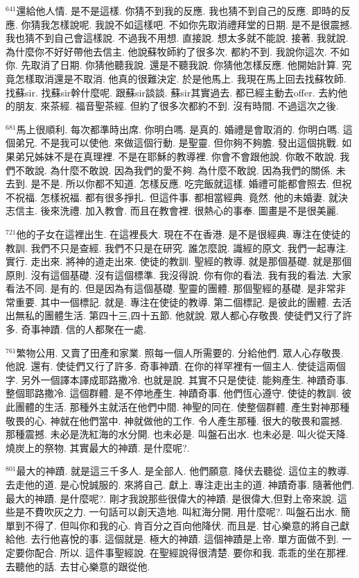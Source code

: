 \documentclass{book}
\begin{document}
$^{641}$還給他人情.
是不是這樣.
你猜不到我的反應.
我也猜不到自己的反應.
即時的反應.
你猜我怎樣說呢.
我說不如這樣吧.
不如你先取消禮拜堂的日期.
是不是很震撼.
我也猜不到自己會這樣說.
不過我不用想.
直接說.
想太多就不能說.
接著.
我就說.
為什麼你不好好帶他去信主.
他說蘇牧師約了很多次.
都約不到.
我說你這次.
不如你.
先取消了日期.
你猜他聽我說.
還是不聽我說.
你猜他怎樣反應.
他開始計算.
究竟怎樣取消還是不取消.
他真的很難決定.
於是他馬上.
我現在馬上回去找蘇牧師.
找蘇sir.
找蘇sir幹什麼呢.
跟蘇sir談談.
蘇sir其實過去.
都已經主動去offer.
去約他的朋友.
來茶經.
福音聖茶經.
但約了很多次都約不到.
沒有時間.
不過這次之後.

$^{681}$馬上很順利.
每次都準時出席.
你明白嗎.
是真的.
婚禮是會取消的.
你明白嗎.
這個弟兄.
不是我可以使他.
來做這個行動.
是聖靈.
但你夠不夠膽.
發出這個挑戰.
如果弟兄姊妹不是在真理裡.
不是在耶穌的教導裡.
你會不會跟他說.
你敢不敢說.
我們不敢說.
為什麼不敢說.
因為我們的愛不夠.
為什麼不敢說.
因為我們的關係.
未去到.
是不是.
所以你都不知道.
怎樣反應.
吃完飯就這樣.
婚禮可能都會照去.
但祝不祝福.
怎樣祝福.
都有很多掙扎.
但這件事.
都相當經典.
竟然.
他的未婚妻.
就決志信主.
後來洗禮.
加入教會.
而且在教會裡.
很熱心的事奉.
圖畫是不是很美麗.

$^{721}$他的子女在這裡出生.
在這裡長大.
現在不在香港.
是不是很經典.
專注在使徒的教訓.
我們不只是查經.
我們不只是在研究.
誰怎麼說.
識經的原文.
我們一起專注.
實行.
走出來.
將神的道走出來.
使徒的教訓.
聖經的教導.
就是那個基礎.
就是那個原則.
沒有這個基礎.
沒有這個標準.
我沒得說.
你有你的看法.
我有我的看法.
大家看法不同.
是有的.
但是因為有這個基礎.
聖靈的團體.
那個聖經的基礎.
是非常非常重要.
其中一個標記.
就是.
專注在使徒的教導.
第二個標記.
是彼此的團體.
去活出無私的團體生活.
第四十三,四十五節.
他就說.
眾人都心存敬畏.
使徒們又行了許多.
奇事神蹟.
信的人都聚在一處.

$^{761}$繁物公用.
又賣了田產和家業.
照每一個人所需要的.
分給他們.
眾人心存敬畏.
他說.
還有.
使徒們又行了許多.
奇事神蹟.
在你的祥罕裡有一個主人.
使徒這兩個字.
另外一個譯本譯成耶路撒冷.
也就是說.
其實不只是使徒.
能夠產生.
神蹟奇事.
整個耶路撒冷.
這個群體.
是不停地產生.
神蹟奇事.
他們恆心遵守.
使徒的教訓.
彼此團體的生活.
那種外主就活在他們中間.
神聖的同在.
使整個群體.
產生對神那種敬畏的心.
神就在他們當中.
神就做他的工作.
令人產生那種.
很大的敬畏和震撼.
那種震撼.
未必是洗紅海的水分開.
也未必是.
叫盤石出水.
也未必是.
叫火從天降.
燒炭上的祭物.
其實最大的神蹟.
是什麼呢?.

$^{801}$最大的神蹟.
就是這三千多人.
是全部人.
他們願意.
降伏去聽從.
這位主的教導.
去走他的道.
是心悅誠服的.
來將自己.
獻上.
專注走出主的道.
神蹟奇事.
隨著他們.
最大的神蹟.
是什麼呢?.
剛才我說那些很偉大的神蹟.
是很偉大,但對上帝來說.
這些是不費吹灰之力.
一句話可以創天造地.
叫紅海分開.
用什麼呢?.
叫盤石出水.
簡單到不得了.
但叫你和我的心.
肯百分之百向他降伏.
而且是.
甘心樂意的將自己獻給他.
去行他喜悅的事.
這個就是.
極大的神蹟.
這個神蹟是上帝.
單方面做不到.
一定要你配合.
所以.
這件事聖經說.
在聖經說得很清楚.
要你和我.
乖乖的坐在那裡.
去聽他的話.
去甘心樂意的跟從他.
\end{document}
